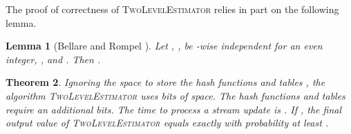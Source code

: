 \documentclass[letterpaper,11pt]{article}
\newcommand{\LemmaName}[1]{\label{lem:#1}}
\newcommand{\TheoremName}[1]{\label{thm:#1}}
\newtheorem{theorem}{Theorem}\newtheorem{corollary}[theorem]{Corollary}
\newtheorem{lemma}[theorem]{Lemma}
\newcommand{\proofbelow}{3pt}
\newcommand{\afterproof}{\hfill  \par \vspace{\proofbelow}}
\begin{document}
The proof of correctness of \textsc{TwoLevelEstimator} relies in part
on the following lemma.

\begin{lemma}[Bellare and Rompel {\cite[Lemma
    2.3]{BR94}}]\LemmaName{br94}
Let , , be -wise independent for 
an even integer,
, and .  Then . \afterproof
\end{lemma}

\begin{theorem}\TheoremName{two-level}
Ignoring the space to store the hash functions  and tables
, the algorithm \textsc{TwoLevelEstimator}
uses  bits of space.  The hash functions  and
tables  require an additional  bits.  The time to
process a stream update is .  If , the final
output value of \textsc{TwoLevelEstimator} 
equals  exactly with probability at least .
\end{theorem}
\end{document}
